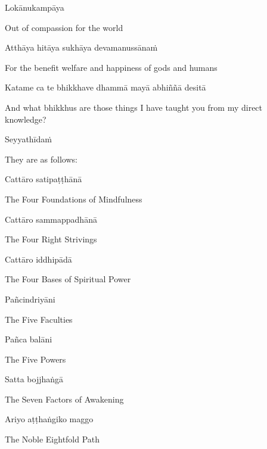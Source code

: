 Lokānukampāya

\begin{english}
  Out of compassion for the world
\end{english}

Atthāya hitāya sukhāya devamanussānaṁ

\begin{english}
  For the benefit welfare and happiness of gods and humans
\end{english}

Katame ca te bhikkhave dhammā mayā abhiññā desitā

\begin{english-hang}
  And what bhikkhus are those things I have taught you from my direct knowledge?
\end{english-hang}

Seyyathīdaṁ

\begin{english}
  They are as follows:
\end{english}

Cattāro satipaṭṭhānā

\begin{english}
  The Four Foundations of Mindfulness
\end{english}

Cattāro sammappadhānā

\begin{english}
  The Four Right Strivings
\end{english}

Cattāro iddhipādā

\begin{english}
  The Four Bases of Spiritual Power
\end{english}

Pañcindriyāni

\begin{english}
  The Five Faculties
\end{english}

Pañca balāni

\begin{english}
  The Five Powers
\end{english}

Satta bojjhaṅgā

\begin{english}
  The Seven Factors of Awakening
\end{english}

Ariyo aṭṭhaṅgiko maggo

\begin{english}
  The Noble Eightfold Path
\end{english}


